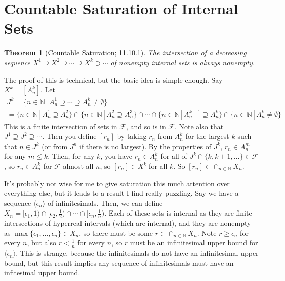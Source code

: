 \documentclass{article}
\newcommand{\sthat}{\,|\,}
\newcommand{\nats}{\mathbb{N}}
\newtheorem*{thm}{Theorem}
\begin{document}
\section*{Countable Saturation of Internal Sets}
\begin{thm}[Countable Saturation; 11.10.1]
    The intersection of a decreasing sequence $X^1 \supseteq X^2 \supseteq \cdots \supseteq X^k \supset \cdots$ of nonempty internal sets is always nonempty.
\end{thm}

The proof of this is technical, but the basic idea is simple enough. Say $X^k = [A_n^k]$. Let
\begin{multline*} 
    J^k = \{n \in \nats \sthat A_n^1 \supseteq \cdots \supseteq A_n^k \neq \emptyset\} \\ = \{n \in \nats \sthat A_n^1 \supseteq A_n^2\} \cap \{n \in \nats \sthat A_n^2 \supseteq A_n^3\} \cap \cdots \cap \{n \in \nats \sthat A_n^{k-1} \supseteq A_n^k\} \cap \{n \in \nats \sthat A_n^k \neq \emptyset\}
\end{multline*}
This is a finite intersection of sets in $\mathcal{F}$, and so is in $\mathcal{F}$. Note also that $J^1 \supseteq J^2 \supseteq \cdots$. Then you define $[r_n]$ by taking $r_n$ from $A_n^k$ for the largest $k$ such that $n \in J^k$ (or from $J^n$ if there is no largest). By the properties of $J^k$, $r_n \in A_n^m$ for any $m \leq k$. Then, for any $k$, you have $r_n \in A_n^k$ for all of $J^k \cap \{k, k+1, \ldots\} \in \mathcal{F}$, so $r_n \in A_n^k$ for $\mathcal{F}$-almost all $n$, so $[r_n] \in X^k$ for all $k$. So $[r_n] \in \cap_{n \in \nats} X_n$.

It's probably not wise for me to give saturation this much attention over everything else, but it leads to a result I find really puzzling. Say we have a sequence $\langle \epsilon_n \rangle$ of infinitesimals. Then, we can define $X_n = [\epsilon_1, 1) \cap [\epsilon_2, \frac{1}{2}) \cap \cdots \cap [\epsilon_n, \frac{1}{n})$. Each of these sets is internal as they are finite intersections of hyperreal intervals (which are internal), and they are nonempty as $\max\{\epsilon_1, \ldots, \epsilon_n\} \in X_n$, so there must be some $r \in \cap_{n \in \nats} X_n$. Note $r \geq \epsilon_n$ for every $n$, but also $r < \frac{1}{n}$ for every $n$, so $r$ must be an infinitesimal upper bound for $\langle \epsilon_n \rangle$. This is strange, because the infinitesimals do not have an infinitesimal upper bound, but this result implies any sequence of infinitesimals must have an infitesimal upper bound. 
\end{document}
